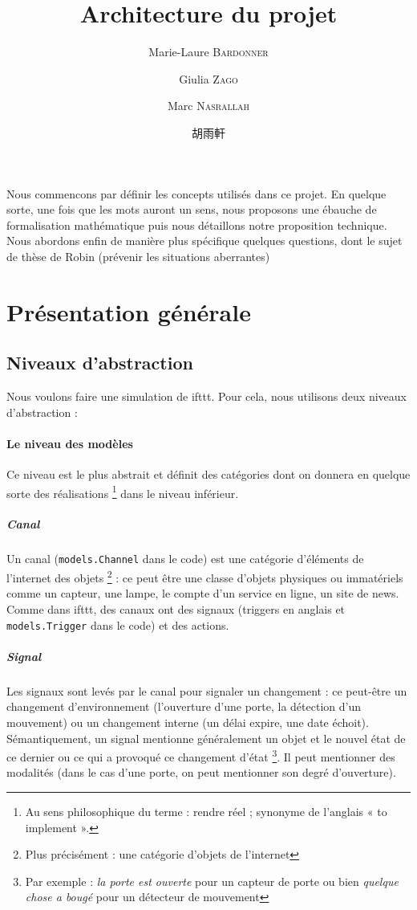 \documentclass[11pt]{article}
\title{Architecture du projet}
\author{Marie-Laure \textsc{Bardonner} \and Giulia \textsc{Zago} \and Marc \textsc{Nasrallah} \and 胡雨軒}
\begin{document}
\maketitle

Nous commencons par définir les concepts utilisés dans ce projet. En quelque sorte, une fois que les mots auront un sens, nous proposons une ébauche de formalisation mathématique puis nous détaillons notre proposition technique. Nous abordons enfin de manière plus spécifique quelques questions, dont le sujet de thèse de Robin (prévenir les situations aberrantes)

\tableofcontents

\section{Présentation générale}

\subsection{Niveaux d'abstraction}

Nous voulons faire une simulation de ifttt. Pour cela, nous utilisons deux niveaux d'abstraction :

\paragraph{Le niveau des modèles} Ce niveau est le plus abstrait et définit des catégories dont on donnera en quelque sorte des réalisations \footnote{Au sens philosophique du terme : rendre réel ; synonyme de l'anglais « to implement ».} dans le niveau inférieur.

\subparagraph{Canal} Un canal (\texttt{models.Channel} dans le code) est une catégorie d'éléments de l'internet des objets \footnote{Plus précisément : une catégorie d'objets de l'internet} : ce peut être une classe d'objets physiques ou immatériels comme un capteur, une lampe, le compte d'un service en ligne, un site de news. Comme dans ifttt, des canaux ont des signaux (triggers en anglais et \texttt{models.Trigger} dans le code) et des actions.

\subparagraph{Signal} Les signaux sont levés par le canal pour signaler un changement : ce peut-être un changement d'environnement (l'ouverture d'une porte, la détection d'un mouvement) ou un changement interne (un délai expire, une date échoit). Sémantiquement, un signal mentionne généralement un objet et le nouvel état de ce dernier ou ce qui a provoqué ce changement d'état \footnote{Par exemple : \textsl{la porte est ouverte} pour un capteur de porte ou bien \textsl{quelque chose a bougé} pour un détecteur de mouvement}. Il peut mentionner des modalités (dans le cas d'une porte, on peut mentionner son degré d'ouverture).
\end{document}
